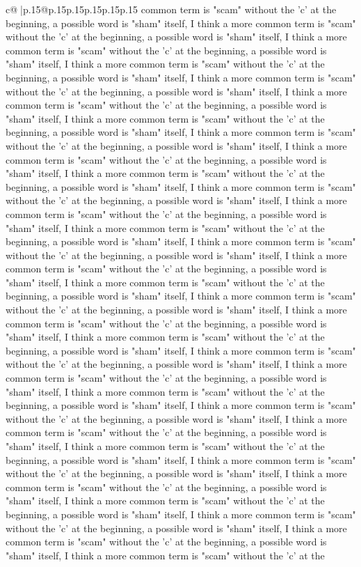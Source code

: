 \documentclass{article}
\begin{document}
{\begin{supertabular}{c@{$\;$}|p{.15\linewidth}@{}p{.15\linewidth}p{.15\linewidth}p{.15\linewidth}p{.15\linewidth}p{.15\linewidth}}
{{{common term is "scam" without the 'c' at the beginning, a possible word is "sham" itself, I think a more common term is "scam" without the 'c' at the beginning, a possible word is "sham" itself, I think a more common term is "scam" without the 'c' at the beginning, a possible word is "sham" itself, I think a more common term is "scam" without the 'c' at the beginning, a possible word is "sham" itself, I think a more common term is "scam" without the 'c' at the beginning, a possible word is "sham" itself, I think a more common term is "scam" without the 'c' at the beginning, a possible word is "sham" itself, I think a more common term is "scam" without the 'c' at the beginning, a possible word is "sham" itself, I think a more common term is "scam" without the 'c' at the beginning, a possible word is "sham" itself, I think a more common term is "scam" without the 'c' at the beginning, a possible word is "sham" itself, I think a more common term is "scam" without the 'c' at the beginning, a possible word is "sham" itself, I think a more common term is "scam" without the 'c' at the beginning, a possible word is "sham" itself, I think a more common term is "scam" without the 'c' at the beginning, a possible word is "sham" itself, I think a more common term is "scam" without the 'c' at the beginning, a possible word is "sham" itself, I think a more common term is "scam" without the 'c' at the beginning, a possible word is "sham" itself, I think a more common term is "scam" without the 'c' at the beginning, a possible word is "sham" itself, I think a more common term is "scam" without the 'c' at the beginning, a possible word is "sham" itself, I think a more common term is "scam" without the 'c' at the beginning, a possible word is "sham" itself, I think a more common term is "scam" without the 'c' at the beginning, a possible word is "sham" itself, I think a more common term is "scam" without the 'c' at the beginning, a possible word is "sham" itself, I think a more common term is "scam" without the 'c' at the beginning, a possible word is "sham" itself, I think a more common term is "scam" without the 'c' at the beginning, a possible word is "sham" itself, I think a more common term is "scam" without the 'c' at the beginning, a possible word is "sham" itself, I think a more common term is "scam" without the 'c' at the beginning, a possible word is "sham" itself, I think a more common term is "scam" without the 'c' at the beginning, a possible word is "sham" itself, I think a more common term is "scam" without the 'c' at the beginning, a possible word is "sham" itself, I think a more common term is "scam" without the 'c' at the beginning, a possible word is "sham" itself, I think a more common term is "scam" without the 'c' at the beginning, a possible word is "sham" itself, I think a more common term is "scam" without the 'c' at the beginning, a possible word is "sham" itself, I think a more common term is "scam" without the 'c' at the beginning, a possible word is "sham" itself, I think a more common term is "scam" without the 'c' at the beginning, a possible word is "sham" itself, I think a more common term is "scam" without the 'c' at the }}}
\end{supertabular}}
\end{document}
